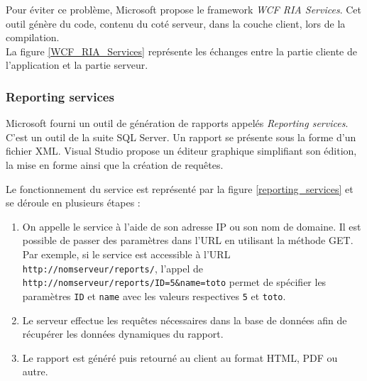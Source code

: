 Pour éviter ce problème, Microsoft propose le framework \textit{WCF RIA Services}. Cet outil génère du code, contenu du coté serveur, dans la couche client, lors de la compilation.
\\


La figure \ref{WCF_RIA_Services} représente les échanges entre la partie cliente de l'application et la partie serveur.


\subsubsection{Reporting services}

Microsoft fourni un outil de génération de rapports appelés \textit{Reporting services}. C'est un outil de la suite SQL Server. Un rapport se présente sous la forme d'un fichier XML. Visual Studio propose un éditeur graphique simplifiant son édition, la mise en forme ainsi que la création de requêtes.

Le fonctionnement du service est représenté par la figure \ref{reporting_services} et se déroule en plusieurs étapes :
\begin{enumerate}
	\item On appelle le service à l'aide de son adresse IP ou son nom de domaine. Il est possible de passer des paramètres dans l'URL en utilisant la méthode GET. Par exemple, si le service est accessible à l'URL \lstinline{http://nomserveur/reports/}, l'appel de \lstinline{http://nomserveur/reports/ID=5&name=toto} permet de spécifier les paramètres \lstinline{ID} et \lstinline{name} avec les valeurs respectives \lstinline{5} et \lstinline{toto}.
	\item Le serveur effectue les requêtes nécessaires dans la base de données afin de récupérer les données dynamiques du rapport.
	\item Le rapport est généré puis retourné au client au format HTML, PDF ou autre.
\end{enumerate}
~~\\

